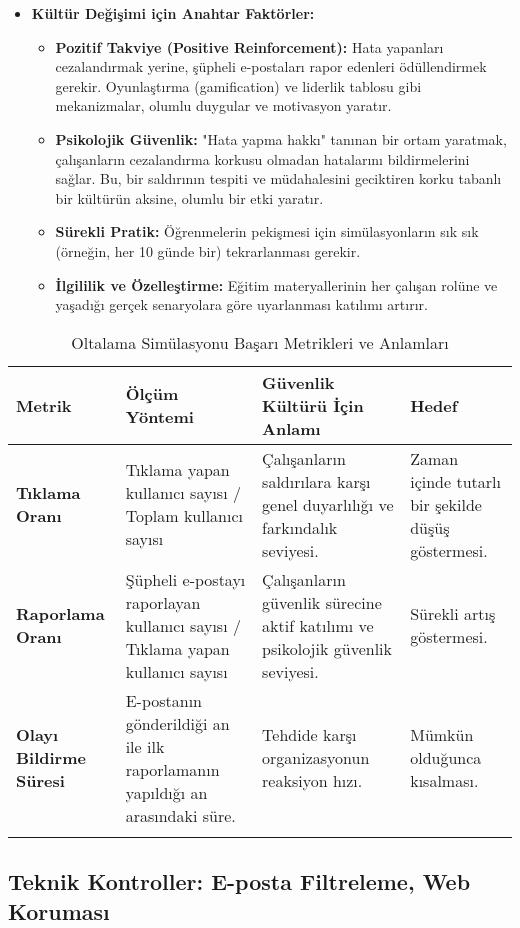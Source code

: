 \begin{itemize}
    \item \textbf{Kültür Değişimi için Anahtar Faktörler:}
    \begin{itemize}
        \item \textbf{Pozitif Takviye (Positive Reinforcement):} Hata yapanları cezalandırmak yerine, şüpheli e-postaları rapor edenleri ödüllendirmek gerekir. Oyunlaştırma (gamification) ve liderlik tablosu gibi mekanizmalar, olumlu duygular ve motivasyon yaratır.
        \item \textbf{Psikolojik Güvenlik:} "Hata yapma hakkı" tanınan bir ortam yaratmak, çalışanların cezalandırma korkusu olmadan hatalarını bildirmelerini sağlar. Bu, bir saldırının tespiti ve müdahalesini geciktiren korku tabanlı bir kültürün aksine, olumlu bir etki yaratır.
        \item \textbf{Sürekli Pratik:} Öğrenmelerin pekişmesi için simülasyonların sık sık (örneğin, her 10 günde bir) tekrarlanması gerekir.
        \item \textbf{İlgililik ve Özelleştirme:} Eğitim materyallerinin her çalışan rolüne ve yaşadığı gerçek senaryolara göre uyarlanması katılımı artırır.
    \end{itemize}
\end{itemize}

\begin{longtable}{|p{4cm}|p{4cm}|p{4cm}|p{4cm}|}
    \hline
    \textbf{Metrik} & \textbf{Ölçüm Yöntemi} & \textbf{Güvenlik Kültürü İçin Anlamı} & \textbf{Hedef} \\
    \hline
    \endhead
    \textbf{Tıklama Oranı} & Tıklama yapan kullanıcı sayısı / Toplam kullanıcı sayısı & Çalışanların saldırılara karşı genel duyarlılığı ve farkındalık seviyesi. & Zaman içinde tutarlı bir şekilde düşüş göstermesi. \\
    \hline
    \textbf{Raporlama Oranı} & Şüpheli e-postayı raporlayan kullanıcı sayısı / Tıklama yapan kullanıcı sayısı & Çalışanların güvenlik sürecine aktif katılımı ve psikolojik güvenlik seviyesi. & Sürekli artış göstermesi. \\
    \hline
    \textbf{Olayı Bildirme Süresi} & E-postanın gönderildiği an ile ilk raporlamanın yapıldığı an arasındaki süre. & Tehdide karşı organizasyonun reaksiyon hızı. & Mümkün olduğunca kısalması. \\
    \hline
\caption{Oltalama Simülasyonu Başarı Metrikleri ve Anlamları}
\end{longtable}

\subsection{Teknik Kontroller: E-posta Filtreleme, Web Koruması}

